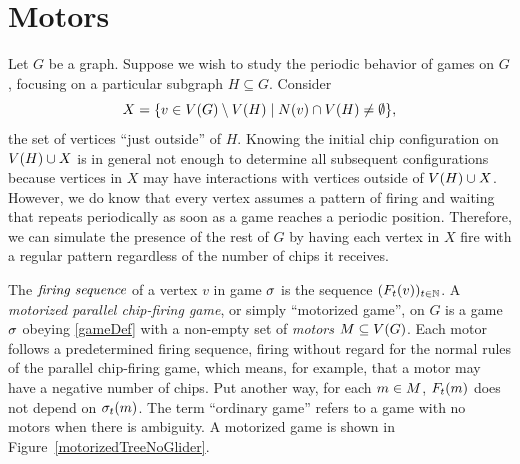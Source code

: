 \section{Motors}\label{motors}

Let $G$ be a graph. Suppose we wish to study the periodic behavior of games on
$G$, focusing on a particular subgraph $H \subseteq G$. Consider
\begin{equation*}
  X = \set{v \in \V \setminus \V[H]}{\N{v} \cap \V[H] \neq \emptyset},
\end{equation*}
the set of vertices ``just outside'' of $H$. Knowing the initial chip
configuration on $\V[H] \cup X$ is in general not enough to determine all
subsequent configurations because vertices in $X$ may have interactions with
vertices outside of $\V[H] \cup X$. However, we do know that every vertex
assumes a pattern of firing and waiting that repeats periodically as soon as a
game reaches a periodic position. Therefore, we can simulate the presence of
the rest of $G$ by having each vertex in $X$ fire with a regular pattern
regardless of the number of chips it receives.

The $\emph{firing sequence}$ of a vertex $v$ in game $\s$ is the sequence
$(\firing{v}{t})_{t \in \nats}$. A \emph{motorized parallel chip-firing game},
or simply ``motorized game'', on $G$ is a game $\s$ obeying \eqref{gameDef}
with a non-empty set of \emph{motors} $\mots \subseteq \V$. Each motor follows
a predetermined firing sequence, firing without regard for the normal rules of
the parallel chip-firing game, which means, for example, that a motor may have
a negative number of chips. Put another way, for each $m \in \mots$,
$\firing{m}{t}$ does not depend on $\chips{m}{t}$. The term ``ordinary game''
refers to a game with no motors when there is ambiguity. A motorized game is
shown in Figure~\ref{motorizedTreeNoGlider}.

